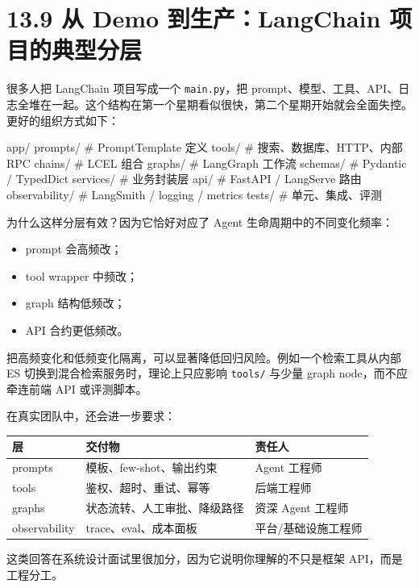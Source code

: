 \section{13.9 从 Demo 到生产：LangChain 项目的典型分层}

很多人把 LangChain 项目写成一个 \texttt{main.py}，把 prompt、模型、工具、API、日志全堆在一起。这个结构在第一个星期看似很快，第二个星期开始就会全面失控。更好的组织方式如下：


\begin{codeblock}
app/
  prompts/         # PromptTemplate 定义
  tools/           # 搜索、数据库、HTTP、内部 RPC
  chains/          # LCEL 组合
  graphs/          # LangGraph 工作流
  schemas/         # Pydantic / TypedDict
  services/        # 业务封装层
  api/             # FastAPI / LangServe 路由
  observability/   # LangSmith / logging / metrics
  tests/           # 单元、集成、评测
\end{codeblock}

为什么这样分层有效？因为它恰好对应了 Agent 生命周期中的不同变化频率：


\begin{itemize}[leftmargin=2em]
\item prompt 会高频改；
\item tool wrapper 中频改；
\item graph 结构低频改；
\item API 合约更低频改。
\end{itemize}

把高频变化和低频变化隔离，可以显著降低回归风险。例如一个检索工具从内部 ES 切换到混合检索服务时，理论上只应影响 \texttt{tools/} 与少量 graph node，而不应牵连前端 API 或评测脚本。


在真实团队中，还会进一步要求：


\begingroup
\scriptsize
\setlength{\tabcolsep}{3pt}
\begin{longtable}{|p{}|p{}|p{}|}
\hline
层 & 交付物 & 责任人 \\ \hline
prompts & 模板、few-shot、输出约束 & Agent 工程师 \\ \hline
tools & 鉴权、超时、重试、幂等 & 后端工程师 \\ \hline
graphs & 状态流转、人工审批、降级路径 & 资深 Agent 工程师 \\ \hline
observability & trace、eval、成本面板 & 平台/基础设施工程师 \\ \hline
\end{longtable}
\endgroup

这类回答在系统设计面试里很加分，因为它说明你理解的不只是框架 API，而是工程分工。


